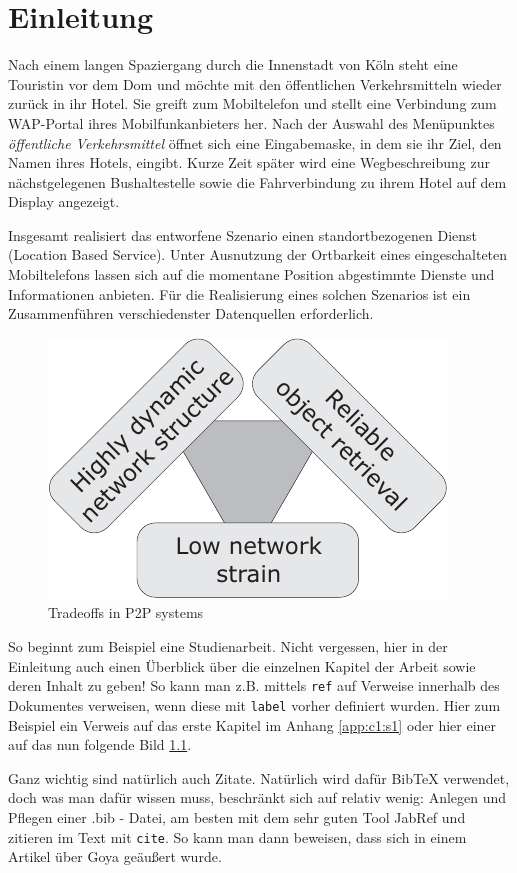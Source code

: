 \chapter{Einleitung}

Nach einem langen Spaziergang durch die Innenstadt von Köln steht eine
Touristin vor dem Dom und möchte mit den öffentlichen Verkehrsmitteln wieder
zurück in ihr Hotel. Sie greift zum Mobiltelefon und stellt eine Verbindung
zum WAP-Portal ihres Mobilfunkanbieters her. Nach der Auswahl des Menüpunktes
{\em öffentliche Verkehrsmittel} öffnet sich eine Eingabemaske, in dem
sie ihr Ziel, den Namen ihres Hotels, eingibt. Kurze Zeit später wird eine
Wegbeschreibung zur nächstgelegenen Bushaltestelle sowie die Fahrverbindung
zu ihrem Hotel auf dem Display angezeigt.

Insgesamt realisiert das entworfene Szenario einen standortbezogenen Dienst
(Location Based Service). Unter Ausnutzung der Ortbarkeit eines eingeschalteten
Mobiltelefons lassen sich auf die momentane Position abgestimmte Dienste
und Informationen anbieten. Für die Realisierung eines solchen Szenarios ist
ein Zusammenführen verschiedenster Datenquellen erforderlich.

\bigskip

\begin{figure}[htbp]
  \centering
  \includegraphics{picture/tradeoff}
  \caption{Tradeoffs in P2P systems}
  \label{fig:tradeoff}
\end{figure}

So beginnt zum Beispiel eine Studienarbeit. Nicht vergessen, hier in der Einleitung auch einen Überblick über die einzelnen Kapitel der Arbeit sowie deren Inhalt zu geben! So kann man z.B. mittels \texttt{ref} auf Verweise innerhalb des Dokumentes verweisen, wenn diese mit \texttt{label} vorher definiert wurden. Hier zum Beispiel ein Verweis auf das erste Kapitel im Anhang \ref{app:c1:s1} oder hier einer auf das nun folgende Bild \ref{fig:tradeoff}.

Ganz wichtig sind natürlich auch Zitate. Natürlich wird dafür BibTeX verwendet, doch was man dafür wissen muss, beschränkt sich auf relativ wenig: Anlegen und Pflegen einer .bib - Datei, am besten mit dem sehr guten Tool JabRef und zitieren im Text mit \texttt{cite}. So kann man dann beweisen, dass sich in einem Artikel \cite{Herschel2003} über Goya geäußert wurde.

